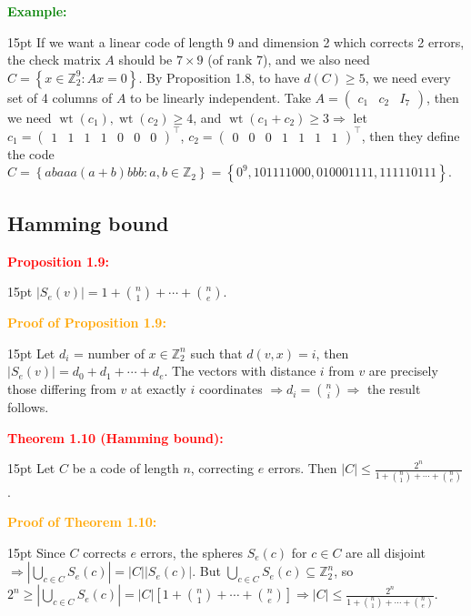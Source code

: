 \documentclass[12pt]{article}
\newcommand{\noparskip}{\vspace{-\parskip}}
\newenvironment{dent}
	{\begin{adjustwidth}{15pt}{}\noparskip}
	{\end{adjustwidth}}
\newenvironment{result}[1]
	{\textcolor{Red}{\textbf{#1:}}\begin{dent}}
	{\end{dent}}
\newenvironment{proof}[1]
	{\textcolor{Orange}{\textbf{Proof of #1:}}\begin{dent}}
	{\end{dent}}
\newenvironment{example}
	{\textcolor{Green}{\textbf{Example:}}\begin{dent}}
	{\end{dent}}
\renewcommand{\implies}{\Rightarrow}
\newcommand{\set}[1]{\left\{ #1 \right\}}
\newcommand{\sizeof}[1]{\left| #1 \right|}
\newcommand{\Z}{\mathbb{Z}}
\newcommand{\wt}[1]{\operatorname{wt}(#1)}
\begin{document}
\begin{example}
If we want a linear code of length 9 and dimension 2 which corrects 2 errors, the check matrix $A$ should be $7 \times 9$ (of rank 7), and we also need $C = \set{x \in \Z_2^9: Ax = 0}$. By Proposition 1.8, to have $d(C) \ge 5$, we need every set of 4 columns of $A$ to be linearly independent. Take $A = \begin{pmatrix} c_1 & c_2 & I_7 \end{pmatrix}$, then we need $\wt{c_1}, \wt{c_2} \ge 4$, and $\wt{c_1 + c_2} \ge 3 \implies$ let $c_1 = \begin{pmatrix} 1 & 1 & 1 & 1 & 0 & 0 & 0 \end{pmatrix}^\top$, $c_2 = \begin{pmatrix} 0 & 0 & 0 & 1 & 1 & 1 & 1 \end{pmatrix}^\top$, then they define the code $C = \set{abaaa(a + b)bbb: a, b \in \Z_2} = \set{0^9, 101111000, 010001111, 111110111}$.
\end{example}

\subsection{Hamming bound}

\begin{result}{Proposition 1.9}
$\sizeof{S_e(v)} = 1 + \binom{n}{1} + \cdots + \binom{n}{e}$.
\end{result}

\begin{proof}{Proposition 1.9}
Let $d_i$ = number of $x \in \Z_2^n$ such that $d(v, x) = i$, then $\sizeof{S_e(v)} = d_0 + d_1 + \cdots + d_e$. The vectors with distance $i$ from $v$ are precisely those differing from $v$ at exactly $i$ coordinates $\implies d_i = \binom{n}{i} \implies$ the result follows.
\end{proof}

\begin{result}{Theorem 1.10 (Hamming bound)}
Let $C$ be a code of length $n$, correcting $e$ errors. Then $\sizeof{C} \le \frac{2^n}{1 + \binom{n}{1} + \cdots + \binom{n}{e}}$.
\end{result}

\begin{proof}{Theorem 1.10}
Since $C$ corrects $e$ errors, the spheres $S_e(c)$ for $c \in C$ are all disjoint $\implies \sizeof{\bigcup_{c \in C}{S_e(c)}} = \sizeof{C} \sizeof{S_e(c)}$. But $\bigcup_{c \in C}{S_e(c)} \subseteq \Z_2^n$, so $2^n \ge \sizeof{\bigcup_{c \in C}{S_e(c)}} = \sizeof{C} \left[1 + \binom{n}{1} + \cdots + \binom{n}{e} \right] \implies \sizeof{C} \le \frac{2^n}{1 + \binom{n}{1} + \cdots + \binom{n}{e}}$.
\end{proof}
\end{document}
